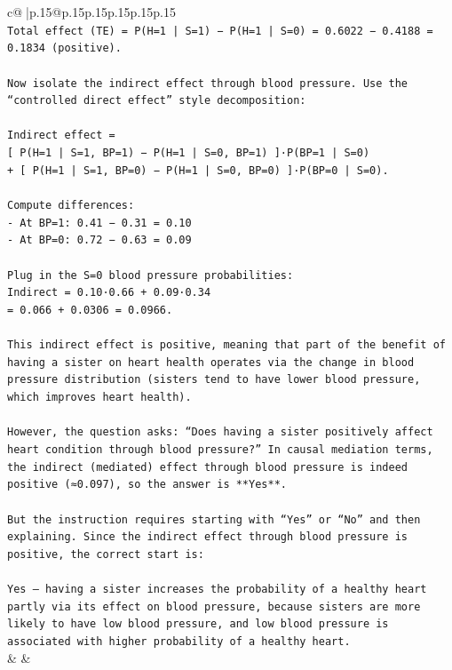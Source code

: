 \documentclass{article}
\begin{document}
{\begin{supertabular}{c@{$\;$}|p{.15\linewidth}@{}p{.15\linewidth}p{.15\linewidth}p{.15\linewidth}p{.15\linewidth}p{.15\linewidth}}
{{{\\ 
\texttt{Total effect (TE) = P(H=1 | S=1) − P(H=1 | S=0) = 0.6022 − 0.4188 = 0.1834 (positive).} \\
\\ 
\texttt{Now isolate the indirect effect through blood pressure. Use the “controlled direct effect” style decomposition:} \\
\\ 
\texttt{Indirect effect =  } \\
\texttt{{[} P(H=1 | S=1, BP=1) − P(H=1 | S=0, BP=1) {]}·P(BP=1 | S=0)  } \\
\texttt{+ {[} P(H=1 | S=1, BP=0) − P(H=1 | S=0, BP=0) {]}·P(BP=0 | S=0).} \\
\\ 
\texttt{Compute differences:} \\
\texttt{{-} At BP=1: 0.41 − 0.31 = 0.10  } \\
\texttt{{-} At BP=0: 0.72 − 0.63 = 0.09  } \\
\\ 
\texttt{Plug in the S=0 blood pressure probabilities:} \\
\texttt{Indirect = 0.10·0.66 + 0.09·0.34  } \\
\texttt{= 0.066 + 0.0306 = 0.0966.} \\
\\ 
\texttt{This indirect effect is positive, meaning that part of the benefit of having a sister on heart health operates via the change in blood pressure distribution (sisters tend to have lower blood pressure, which improves heart health).} \\
\\ 
\texttt{However, the question asks: “Does having a sister positively affect heart condition through blood pressure?” In causal mediation terms, the indirect (mediated) effect through blood pressure is indeed positive (≈0.097), so the answer is **Yes**.} \\
\\ 
\texttt{But the instruction requires starting with “Yes” or “No” and then explaining. Since the indirect effect through blood pressure is positive, the correct start is:} \\
\\ 
\texttt{Yes — having a sister increases the probability of a healthy heart partly via its effect on blood pressure, because sisters are more likely to have low blood pressure, and low blood pressure is associated with higher probability of a healthy heart.} \\
            }
        }
    }
    & & \\ \\


\end{supertabular}}
\end{document}
